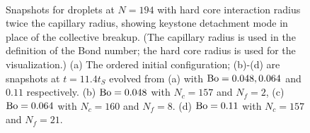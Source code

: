 \documentclass[aps,prl,superscriptaddress,twocolumn,showpacs,floatfix]{revtex4-1}
\begin{document}
\begin{figure}[tbph]
\centering
{}
\\
\caption{Snapshots for droplets at $N=194$ with hard core interaction radius twice the capillary radius, showing keystone detachment mode in place of the collective breakup. (The capillary radius is used in the definition of the Bond number; the hard core radius is used for the visualization.) (a) The ordered initial configuration; (b)-(d) are snapshots at $t=11.4t_S$ evolved from (a) with $\rm Bo=0.048, 0.064$ and $0.11$ respectively. (b) $\rm Bo=0.048$ with $N_{c}=157$ and $N_{f}=2$, (c) $\rm Bo=0.064$ with $N_{c}=160$ and  $N_{f}=8$. (d) $\rm Bo=0.11$ with $N_{c}=157$ and $N_{f}=21$.}
\label{fig:N194aH7.8/unstable}
\end{figure}
\end{document}

